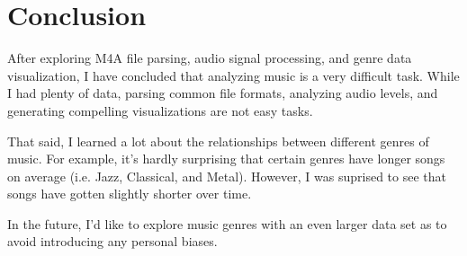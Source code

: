 \documentclass[journal]{vgtc}                %
\begin{document}
\section{Conclusion}

After exploring M4A file parsing, audio signal processing, and genre data
visualization, I have concluded that analyzing music is a very difficult task.
While I had plenty of data, parsing common file formats, analyzing audio levels,
and generating compelling visualizations are not easy tasks.

That said, I learned a lot about the relationships between different genres
of music. For example, it's hardly surprising that certain genres have
longer songs on average (i.e. Jazz, Classical, and Metal). However, I was
suprised to see that songs have gotten slightly shorter over time.

In the future, I'd like to explore music genres with an even larger data set as
to avoid introducing any personal biases.

%

%
%
%


\end{document}
